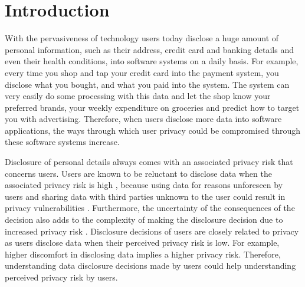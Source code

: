 \documentclass[conference]{IEEEtran}
\begin{document}
\maketitle

\begin{abstract}


\end{abstract}


%
\IEEEpeerreviewmaketitle

\section{Introduction}
With the pervasiveness of technology users today disclose a huge amount of personal information, such as their address, credit card and banking details and even their health conditions, into software systems on a daily basis. For example, every time you shop and tap your credit card into the payment system, you disclose what you bought, and what you paid into the system. The system can very easily do some processing with this data and let the shop know your preferred brands, your weekly expenditure on groceries and predict how to target you with advertising. Therefore, when users disclose more data into software applications, the ways through which user privacy could be compromised through these software systems increase. 

Disclosure of personal details always comes with an associated privacy risk that concerns users. Users are known to be reluctant to disclose data when the associated privacy risk is high \cite {kobsa2007privacy}, because using data for reasons unforeseen by users and sharing data with third parties unknown to the user could result in privacy vulnerabilities \cite {malhotra2004internet}. Furthermore, the uncertainty of the consequences of the decision also adds to the complexity of making the disclosure decision due to increased privacy risk \cite {knijnenburg2013helping}. Disclosure decisions of users are closely related to privacy as users disclose data when their perceived privacy risk is low. For example, higher discomfort in disclosing data implies a higher privacy risk. Therefore, understanding data disclosure decisions made by users could help understanding perceived privacy risk by users.
\end{document}
